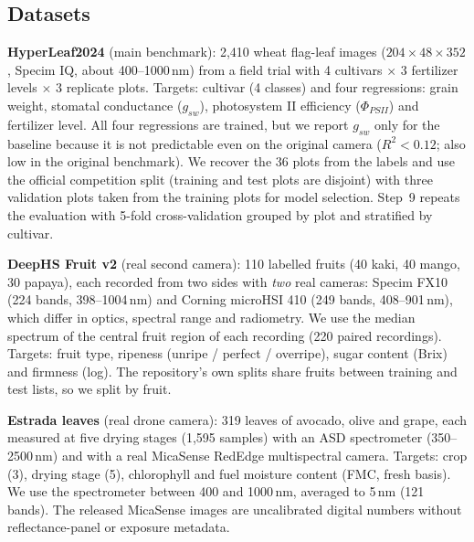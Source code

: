 \documentclass[preprint,12pt,authoryear]{elsarticle}
\begin{document}
\subsection{Datasets}
\textbf{HyperLeaf2024} \citep{laprade2024hyperleaf} (main benchmark): 2,410 wheat flag-leaf images
($204\times48\times352$, Specim IQ, about 400--1000\,nm) from a field trial with 4 cultivars $\times$ 3 fertilizer
levels $\times$ 3 replicate plots. Targets: cultivar (4 classes) and four regressions: grain weight, stomatal conductance
($g_{sw}$), photosystem II efficiency ($\Phi_{PSII}$) and fertilizer level. All four regressions are trained, but we
report $g_{sw}$ only for the baseline because it is not predictable even on the original camera ($R^2<0.12$; also
low in the original benchmark). We recover the 36 plots from the labels and use the official competition split
(training and test plots are disjoint) with three validation plots taken from the training plots for model selection.
Step~9 repeats the evaluation with 5-fold cross-validation grouped by plot and stratified by cultivar.

\textbf{DeepHS Fruit v2} \citep{varga2021ripeness,frank2023benchmark} (real second camera): 110 labelled fruits (40 kaki,
40 mango, 30 papaya), each recorded from two sides with \emph{two} real cameras: Specim FX10 (224 bands, 398--1004\,nm)
and Corning microHSI 410 (249 bands, 408--901\,nm), which differ in optics, spectral range and radiometry. We use the
median spectrum of the central fruit region of each recording (220 paired recordings). Targets: fruit type, ripeness
(unripe / perfect / overripe), sugar content (Brix) and firmness (log). The repository's own splits share fruits between
training and test lists, so we split by fruit.

\textbf{Estrada leaves} \citep{estrada2025leaves} (real drone camera): 319 leaves of avocado, olive and grape, each
measured at five drying stages (1,595 samples) with an ASD spectrometer (350--2500\,nm) and with a real MicaSense
RedEdge multispectral camera. Targets: crop (3), drying stage (5), chlorophyll and fuel moisture content (FMC, fresh
basis). We use the spectrometer between 400 and 1000\,nm, averaged to 5\,nm (121 bands). The released MicaSense images
are uncalibrated digital numbers without reflectance-panel or exposure metadata.
\end{document}
